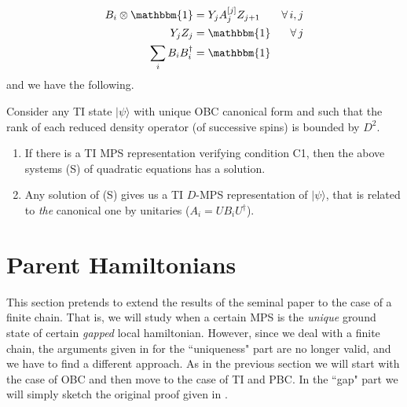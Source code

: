 \documentclass[aps,prl,epsfig,graphics,floatfix,mathbbm,a4paper]{article}
\newcommand{\1}{\mathbbm{1}}
\renewcommand{\>}{\rangle}
\newcommand{\<}{\langle}
\begin{document}
\begin{align*} B_i\otimes \mathbbm{1}  & = Y_j A_j^{[j]}
               Z_{j+1}
                                       & \forall \, i,j                 \\
               Y_jZ_j                  & =\mathbbm{1}    & \forall \, j \\
               \sum_i B_iB_i^{\dagger} & =\mathbbm{1}
\end{align*}
and we have the following.
\begin{theorem} Consider any TI state
    $|\psi\>$ with unique OBC canonical form and such that the rank of
    each reduced density operator (of successive spins) is bounded by
    $D^2$.
    \begin{enumerate}
        \item If there is a TI MPS representation verifying condition C1,
              then the above systems (S) of quadratic equations has a solution.
        \item Any solution of (S) gives us a TI $D$-MPS representation of
              $|\psi\>$, that is related to \textit{the} canonical one by
              unitaries ($A_i=UB_iU^{\dagger}$).
    \end{enumerate}
\end{theorem}


\section{Parent Hamiltonians}\label{Sec:Hamiltonians}

This section pretends to extend the results of the seminal paper
\cite{FaNaWe92} to the case of a finite chain. That is, we will
study when a certain MPS is the \textit{unique} ground state of
certain \textit{gapped} local hamiltonian.  However, since we deal
with a finite chain, the arguments given in \cite{FaNaWe92} for
the ``uniqueness" part are  no longer valid, and we have to find a
different approach. As in the previous section we will start with
the case of OBC and then move to the case of TI and PBC. In the
``gap" part we will simply sketch the original proof given in
\cite{FaNaWe92}.
\end{document}
